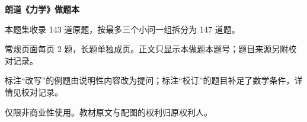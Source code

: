 \documentclass[UTF8,a4paper,12pt,fontset=fandol]{ctexart}
\begin{document}
\thispagestyle{empty}
\begin{center}{\LARGE\bfseries 朗道《力学》做题本}\par\vspace{6mm}{\large 完整题集}\end{center}
本题集收录 143 道原题，按最多三个小问一组拆分为 147 道题。

常规页面每页 2 题，长题单独成页。正文只显示本做题本题号；题目来源另附校对记录。

标注“改写”的例题由说明性内容改为提问；标注“校订”的题目补足了数学条件，详情见校对记录。

仅限非商业性使用。教材原文与配图的权利归原权利人。
\tableofcontents\clearpage
\clearpage
\clearpage
\clearpage
\clearpage
\clearpage
\clearpage
\clearpage
\end{document}
